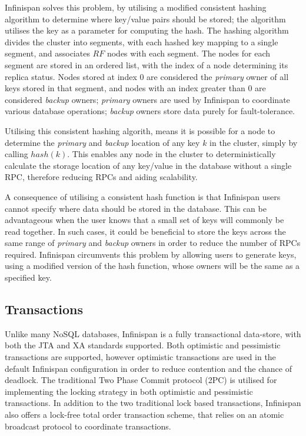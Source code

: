     Infinispan solves this problem, by utilising a modified consistent hashing algorithm \citep{Karger:1997:CHR:258533.258660, Infinispan, Ruivo:2011:ETO:2120967.2121604} to determine where key/value pairs should be stored; the algorithm utilises the key as a parameter for computing the hash.  The hashing algorithm divides the cluster into segments, with each hashed key mapping to a single segment, and associates $RF$ nodes with each segment. The nodes for each segment are stored in an ordered list, with the index of a node determining its replica status.  Nodes stored at index 0 are considered the \emph{primary} owner of all keys stored in that segment, and nodes with an index greater than 0 are considered \emph{backup} owners; \emph{primary} owners are used by Infinispan to coordinate various database operations; \emph{backup} owners store data purely for fault-tolerance.  
 
    Utilising this consistent hashing algorith, means it is possible for a node to determine the \emph{primary} and \emph{backup} location of any key $k$ in the cluster, simply by calling $hash(k)$. This enables any node in the cluster to deterministically calculate the storage location of any key/value in the database without a single RPC, therefore reducing RPCs and aiding scalability.  
    
    A consequence of utilising a consistent hash function is that Infinispan users cannot specify where data should be stored in the database. This can be advantageous when the user knows that a small set of keys will commonly be read together.  In such cases, it could be beneficial to store the keys across the same range of \emph{primary} and \emph{backup} owners in order to reduce the number of RPCs required.  Infinispan circumvents this problem by allowing users to generate keys, using a modified version of the hash function, whose owners will be the same as a specified key.  
    
    \subsection{Transactions}
    Unlike many NoSQL databases, Infinispan is a fully transactional data-store, with both the JTA\citep{JTA} and XA\citep{XA} standards supported.  Both optimistic \citep{Kung:1981:OMC:319566.319567} and pessimistic transactions\citep{Bernstein:1981:CCD:356842.356846} are supported, however optimistic transactions are used in the default Infinispan configuration in order to reduce contention and the chance of deadlock.  The traditional Two Phase Commit protocol (2PC)\citep{Bernstein:1996:PTP:261193} is utilised for implementing the locking strategy in both optimistic and pessimistic transactions.  In addition to the two traditional lock based transactions, Infinispan also offers a lock-free total order transaction scheme, that relies on an atomic broadcast protocol to coordinate transactions.  
	    
